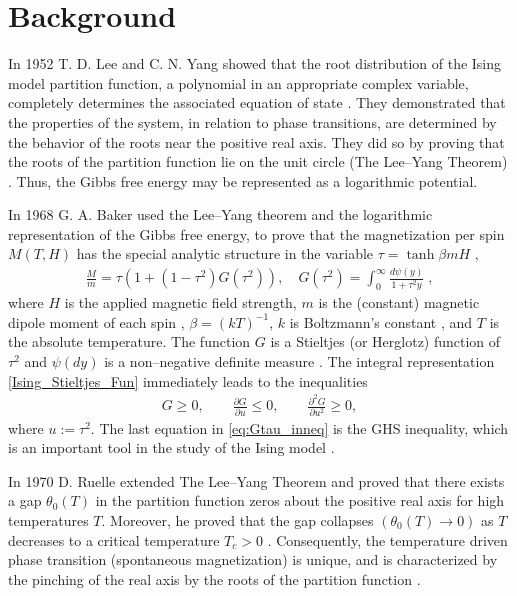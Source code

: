 \documentclass[jmp,graphicx]{revtex4-1}
\begin{document}
\section{Background}\label{sec:Background}
%
In 1952 T. D. Lee and C. N. Yang showed that the root distribution of
the Ising model partition function, a polynomial in an appropriate
complex variable, completely determines the associated equation of
state \cite{Yang:PR:404}. They demonstrated that the properties
of the system, in relation to phase transitions, are determined by the
behavior of the roots near the positive real axis. They did so by
proving that the roots of the partition function lie on the unit circle
(The Lee--Yang Theorem) \cite{Lee:PR:411,Ruelle-1969}. Thus, the Gibbs
free energy may be represented as a logarithmic potential.

In 1968 G. A. Baker used the
Lee--Yang theorem and the logarithmic representation of the Gibbs free
energy, to prove that the magnetization per spin $M(T,H)$
has the special analytic structure in the variable $\tau=\tanh{\beta mH}$
\cite{Baker:PRL-990}, 
%
\begin{align}\label{Ising_Stieltjes_Fun}
  \frac{M}{m} =\tau(1+(1-\tau^2)G(\tau^2)), \quad
  G(\tau^2)=\int_0^\infty\frac{d\psi(y)}{1+\tau^2y}\;, %
\end{align}
%
where $H$ is the applied magnetic field strength, $m$ is the
(constant) magnetic dipole moment of each spin \cite{Griffiths-1999},
$\beta=(kT)^{-1}$, $k$ is Boltzmann's constant \cite{Thompson-1988}, and
$T$ is the absolute temperature. The function $G$ is a Stieltjes (or
Herglotz) function of $\tau^2$ and $\psi(dy)$ is a non--negative definite
measure \cite{Baker:PRL-990}.  The integral representation
\eqref{Ising_Stieltjes_Fun} immediately leads to the inequalities   
%
\begin{align}\label{eq:Gtau_inneq}
  G\geq0, \qquad \frac{\partial G}{\partial u}\leq0, \qquad \frac{\partial^2G}{\partial u^2}\geq0,
\end{align}
%
where $u:=\tau^2$. The last equation in \eqref{eq:Gtau_inneq} is the GHS
inequality, which is an important tool in the study of the Ising model
\cite{Golden:JMP-5627}. 

In 1970 D. Ruelle extended The Lee--Yang Theorem and proved that
there exists a gap $\theta_0(T)$ in the partition function zeros about the
positive real axis for high temperatures $T$. Moreover, he proved that
the gap collapses $(\theta_0(T)\to0)$ as $T$ decreases to a critical
temperature $T_c>0$ \cite{Ruelle:PRL:303}. Consequently, the
temperature driven phase transition (spontaneous magnetization) is
unique, and is characterized by the pinching of the real axis by the
roots of the partition function \cite{Ruelle-1969,Ruelle:AM:589}. 
\end{document}
